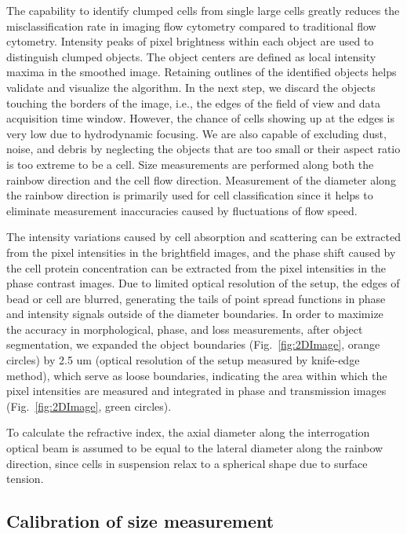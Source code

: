 \documentclass[aps,pra,reprint,longbibliography,superscriptaddress]{revtex4-1}
\begin{document}
The capability to identify clumped cells from single large cells greatly reduces the misclassification rate in imaging flow cytometry compared to traditional flow cytometry. Intensity peaks of pixel brightness within each object are used to distinguish clumped objects. The object centers are defined as local intensity maxima in the smoothed image. Retaining outlines of the identified objects helps validate and visualize the algorithm. In the next step, we discard the objects touching the borders of the image, i.e., the edges of the field of view and data acquisition time window. However, the chance of cells showing up at the edges is very low due to hydrodynamic focusing. We are also capable of excluding dust, noise, and debris by neglecting the objects that are too small or their aspect ratio is too extreme to be a cell. Size measurements are performed along both the rainbow direction and the cell flow direction. Measurement of the diameter along the rainbow direction is primarily used for cell classification since it helps to eliminate measurement inaccuracies caused by fluctuations of flow speed. 

The intensity variations caused by cell absorption and scattering can be extracted from the pixel intensities in the brightfield images, and the phase shift caused by the cell protein concentration can be extracted from the pixel intensities in the phase contrast images. Due to limited optical resolution of the setup, the edges of bead or cell are blurred, generating the tails of point spread functions in phase and intensity signals outside of the diameter boundaries. In order to maximize the accuracy in morphological, phase, and loss measurements, after object segmentation, we expanded the object boundaries (Fig.~\ref{fig:2DImage}, orange circles) by 2.5 um (optical resolution of the setup measured by knife-edge method), which serve as loose boundaries, indicating the area within which the pixel intensities are measured and integrated in phase and transmission images (Fig.~\ref{fig:2DImage}, green circles).

To calculate the refractive index, the axial diameter along the interrogation optical beam is assumed to be equal to the lateral diameter along the rainbow direction, since cells in suspension relax to a spherical shape due to surface tension.


\subsection{Calibration of size measurement}
\end{document}
